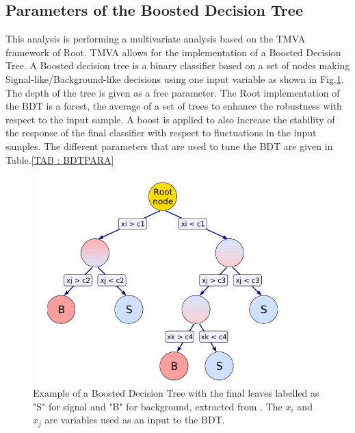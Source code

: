 \documentclass{cernatlasnote}
\begin{document}
\subsection{Parameters of the Boosted Decision Tree}
\label{APP: BDTPARA}

This analysis is performing a multivariate analysis based on the TMVA framework of Root. TMVA allows for the implementation of a Boosted Decision Tree. A Boosted decision tree is a binary classifier based on a set of nodes making Signal-like/Background-like decisions using one input variable as shown in Fig.\ref{fig:BDTRoot}. The depth of the tree is  given as a free parameter. The Root implementation of the BDT is a forest, the average of a set of trees to enhance the robustness with respect to the input sample. A boost is applied to also increase the stability of the response of the final classifier with respect to fluctuations in the input samples. The different parameters that are used to tune the BDT are given in Table.\ref{TAB : BDTPARA}

\begin{figure}[ht]
\centering
\includegraphics[height=8cm, width=10cm, trim= 0cm 0cm 0cm 0cm,clip]{images/BDT/BDTRoot.png}
\caption{\label{fig:BDTRoot} Example of a Boosted Decision Tree with the final leaves labelled as "S" for signal and "B" for background, extracted from \cite{TMVA}. The $x_i$ and $x_j$ are variables used as an input to the BDT.}
\end{figure} 
\end{document}
